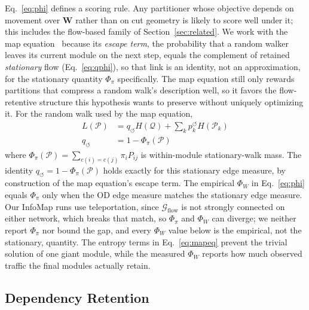 \documentclass[journal]{IEEEtran}
\theoremstyle{definition}
\begin{document}
Eq.~\eqref{eq:phi} defines a scoring rule. Any partitioner whose objective depends on movement over $\mathbf{W}$ rather than on cut geometry is likely to score well under it; this includes the flow-based family of Section~\ref{sec:related}. We work with the map equation~\citep{rosvall2008maps,rosvall2009mapequation} because its \emph{escape term}, the probability that a random walker leaves its current module on the next step, equals the complement of retained \emph{stationary} flow (Eq.~\eqref{eq:qphi}), so that link is an identity, not an approximation, for the stationary quantity $\Phi_\pi$ specifically. The map equation still only rewards partitions that compress a random walk's description well, so it favors the flow-retentive structure this hypothesis wants to preserve without uniquely optimizing it.
For the random walk used by the map equation,
\begin{align}
    L(\mathcal{P})
     & =
    q_{\circlearrowleft}H(\mathcal{Q})
    +\sum_k p_k^{\circlearrowleft}H(\mathcal{P}_k)
    \label{eq:mapeq} \\
    q_{\circlearrowleft}
     & =
    1-\Phi_\pi(\mathcal{P})
    \label{eq:qphi}
\end{align}
where $\Phi_\pi(\mathcal{P})=\sum_{c(i)=c(j)}\pi_iP_{ij}$ is within-module stationary-walk mass. The identity $q_{\circlearrowleft}=1-\Phi_\pi(\mathcal{P})$ holds exactly for this stationary edge measure, by construction of the map equation's escape term. The empirical $\Phi_W$ in Eq.~\eqref{eq:phi} equals $\Phi_\pi$ only when the OD edge measure matches the stationary edge measure. Our InfoMap runs use teleportation, since $\mathcal{G}_{\mathrm{flow}}$ is not strongly connected on either network, which breaks that match, so $\Phi_\pi$ and $\Phi_W$ can diverge; we neither report $\Phi_\pi$ nor bound the gap, and every $\Phi_W$ value below is the empirical, not the stationary, quantity. The entropy terms in Eq.~\eqref{eq:mapeq} prevent the trivial solution of one giant module, while the measured $\Phi_W$ reports how much observed traffic the final modules actually retain.

\subsection{Dependency Retention}
\label{sec:psi}
\end{document}
